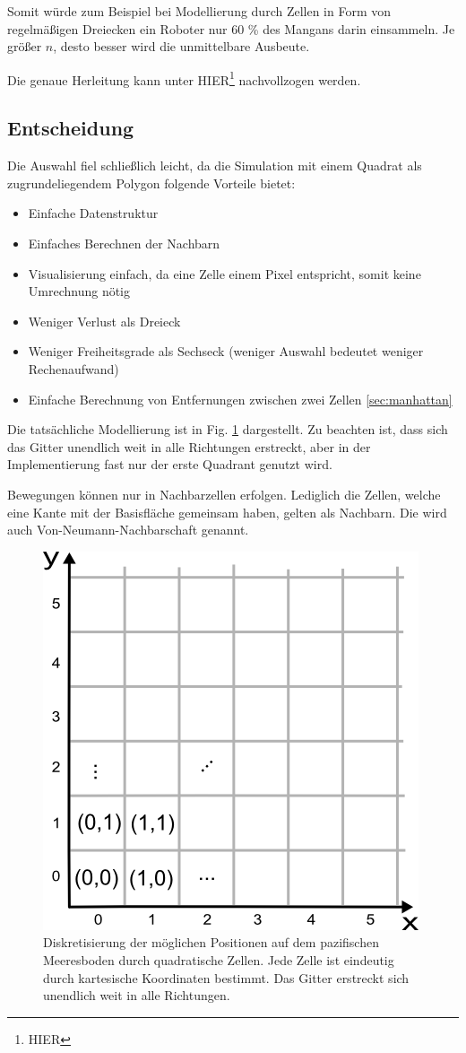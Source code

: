 \documentclass{article}
\begin{document}
Somit würde zum Beispiel bei Modellierung durch Zellen in Form von regelmäßigen Dreiecken ein Roboter
nur 60 \% des Mangans darin einsammeln. Je größer $n$, desto besser wird die unmittelbare Ausbeute.


Die genaue Herleitung kann unter HIER\footnote{HIER} nachvollzogen werden.

\subsection{Entscheidung}

Die Auswahl fiel schließlich leicht, da die Simulation mit einem Quadrat als 
zugrundeliegendem Polygon folgende Vorteile bietet:

\begin{itemize}
\item Einfache Datenstruktur
\item Einfaches Berechnen der Nachbarn
\item Visualisierung einfach, da eine Zelle einem Pixel entspricht, somit keine Umrechnung nötig
\item Weniger Verlust als Dreieck
\item Weniger Freiheitsgrade als Sechseck (weniger Auswahl bedeutet weniger Rechenaufwand)
\item Einfache Berechnung von Entfernungen zwischen zwei Zellen \ref{sec:manhattan}
\end{itemize}

Die tatsächliche Modellierung ist in Fig. \ref{img:ocean_floor_squared} dargestellt. Zu beachten ist,
dass sich das Gitter unendlich weit in alle Richtungen erstreckt, aber in der Implementierung
fast nur der erste Quadrant genutzt wird. 

Bewegungen können nur in Nachbarzellen erfolgen. Lediglich die Zellen, welche eine Kante mit der 
Basisfläche gemeinsam haben, gelten als Nachbarn. Die wird auch Von-Neumann-Nachbarschaft genannt.

\begin{figure}[hbt]
\centering
\includegraphics[width=.5\textwidth]{img/ocean_floor.png}
\caption{Diskretisierung der möglichen Positionen auf dem pazifischen Meeresboden durch quadratische Zellen. Jede Zelle
ist eindeutig durch kartesische Koordinaten bestimmt. Das Gitter erstreckt sich unendlich weit in alle Richtungen. }
\label{img:ocean_floor_squared}
\end{figure} 
\end{document}
